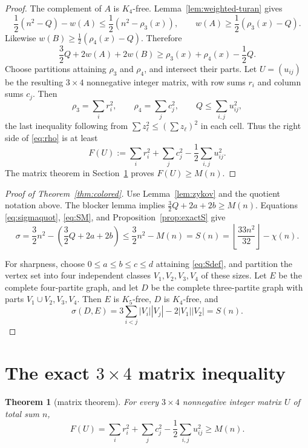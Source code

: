 \documentclass[11pt]{article}
\theoremstyle{plain}
\newtheorem{theorem}{Theorem}[section]
\theoremstyle{definition}
\theoremstyle{remark}
\newcommand{\1}{\mathbf 1}
\begin{document}
\begin{proof}
The complement of $A$ is $K_4$-free.  Lemma~\ref{lem:weighted-turan} gives
\[
 \frac12(n^2-Q)-w(A)\leq\frac12(n^2-\rho_3(x)),
 \qquad
 w(A)\geq\frac12(\rho_3(x)-Q).
\]
Likewise
$w(B)\geq\frac12(\rho_4(x)-Q)$.  Therefore
\begin{equation}\label{eq:rho}
 \frac32Q+2w(A)+2w(B)
 \geq\rho_3(x)+\rho_4(x)-\frac12Q.
\end{equation}
Choose partitions attaining $\rho_3$ and $\rho_4$, and intersect their parts.
Let $U=(u_{ij})$ be the resulting $3\times4$ nonnegative integer matrix, with
row sums $r_i$ and column sums $c_j$.  Then
\[
 \rho_3=\sum_i r_i^2,
 \qquad \rho_4=\sum_j c_j^2,
 \qquad Q\leq\sum_{i,j}u_{ij}^2,
\]
the last inequality following from $\sum z_\ell^2\leq(\sum z_\ell)^2$ in
each cell.  Thus the right side of \eqref{eq:rho} is at least
\[
 F(U):=\sum_i r_i^2+\sum_jc_j^2-\frac12\sum_{i,j}u_{ij}^2.
\]
The matrix theorem in Section~\ref{sec:matrix} proves $F(U)\geq M(n)$.
\end{proof}

\begin{proof}[Proof of Theorem~\ref{thm:colored}]
Use Lemma~\ref{lem:zykov} and the quotient notation above.  The blocker lemma
implies $\frac32Q+2a+2b\geq M(n)$.  Equations
\eqref{eq:sigmaquot}, \eqref{eq:SM}, and Proposition~\ref{prop:exactS} give
\[
 \sigma=\frac32n^2-\left(\frac32Q+2a+2b\right)
 \leq\frac32n^2-M(n)=S(n)
 =\left\lfloor\frac{33n^2}{32}\right\rfloor-\chi(n).
\]

For sharpness, choose $0\leq a\leq b\leq c\leq d$ attaining
\eqref{eq:Sdef}, and partition the vertex set into four independent classes
$V_1,V_2,V_3,V_4$ of these sizes.  Let $E$ be the complete four-partite
graph, and let $D$ be the complete three-partite graph with parts
$V_1\cup V_2,V_3,V_4$.  Then $E$ is $K_5$-free, $D$ is $K_4$-free, and
\[
 \sigma(D,E)=3\sum_{i<j}|V_i||V_j|-2|V_1||V_2|=S(n).
\]
\end{proof}

\section{The exact \texorpdfstring{$3\times4$}{3 x 4} matrix inequality}\label{sec:matrix}

\begin{theorem}[matrix theorem]\label{thm:matrix}
For every $3\times4$ nonnegative integer matrix $U$ of total sum $n$,
\begin{equation}\label{eq:matrix}
 F(U)=\sum_i r_i^2+\sum_jc_j^2-\frac12\sum_{i,j}u_{ij}^2\geq M(n).
\end{equation}
\end{theorem}
\end{document}
